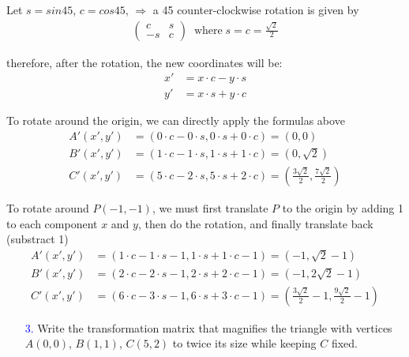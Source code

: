 \documentclass[11pt]{article}  %
\begin{document}
    \solution
    
    Let $s=sin45$, $c=cos45$, $\Rightarrow$ a 45\textdegree\hspace{0mm} counter-clockwise rotation is given by
    \begin{align*}
        \begin{pmatrix}
            c & s\\-s & c
        \end{pmatrix}
        \;\;\text{where}\; s = c = \frac{\sqrt{2}}{2}
    \end{align*}
    
    therefore, after the rotation, the new coordinates will be:
    \begin{align*}
        x' &= x \cdot c - y \cdot s\\
        y' &= x \cdot s + y \cdot c
    \end{align*}
    
    To rotate around the origin, we can directly apply the formulas above
    \begin{align*}
        A'(x', y') &= (0 \cdot c - 0 \cdot s, 0 \cdot s + 0 \cdot c) = (0, 0)\\
        B'(x', y') &= (1 \cdot c - 1 \cdot s, 1 \cdot s + 1 \cdot c) = (0, \sqrt{2})\\
        C'(x', y') &= (5 \cdot c - 2 \cdot s, 5 \cdot s + 2 \cdot c) = (\frac{3\sqrt{2}}{2}, \frac{7\sqrt{2}}{2})
    \end{align*}
    
    To rotate around $P(-1,-1)$, we must first translate $P$ to the origin by adding 1 to each component $x$ and $y$, then do the rotation, and finally translate back (substract 1)
    \begin{align*}
        A'(x', y') &= (1 \cdot c - 1 \cdot s - 1, 1 \cdot s + 1 \cdot c - 1) = (-1, \sqrt{2}-1)\\
        B'(x', y') &= (2 \cdot c - 2 \cdot s - 1, 2 \cdot s + 2 \cdot c - 1) = (-1, 2\sqrt{2}-1)\\
        C'(x', y') &= (6 \cdot c - 3 \cdot s - 1, 6 \cdot s + 3 \cdot c - 1) = (\frac{3\sqrt{2}}{2}-1, \frac{9\sqrt{2}}{2}-1)
    \end{align*}

    \begin{enumerate}[leftmargin=*]
        \item[\textcolor{blue}{3.}] Write the transformation matrix that magnifies the triangle with vertices $A(0,0)$, $B(1,1)$, $C(5,2)$ to twice its size while keeping $C$ fixed.
    \end{enumerate}
    
\end{document}
